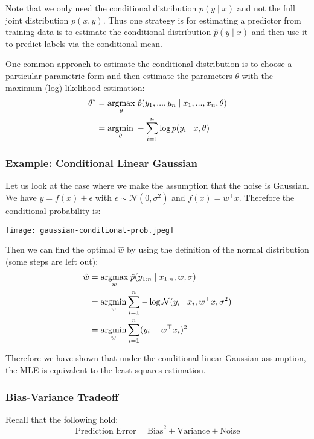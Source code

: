 Note that we only need the conditional distribution $p(y \; | \; x)$ and not the full joint distribution $p(x, y)$. Thus one strategy is for estimating a predictor from training data is to estimate the conditional distribution $\hat{p}(y \; | \; x)$ and then use it to predict labels via the conditional mean. \medskip

One common approach to estimate the conditional distribution is to choose a particular parametric form and then estimate the parameters $\theta$ with the maximum (log) likelihood estimation:
\begin{align*}
	\theta^* &= \underset{\theta}{\text{argmax}} \; \hat{p}(y_1, ..., y_n \; | \; x_1, ..., x_n, \theta) \\
	&= \underset{\theta}{\text{argmin}} \; - \sum_{i=1}^n \log p(y_i \; | \; x, \theta) 
\end{align*}

\subsubsection{Example: Conditional Linear Gaussian}

Let us look at the case where we make the assumption that the noise is Gaussian. We have $y = f(x) + \epsilon$ with $\epsilon \sim \mathcal{N}(0, \sigma^2)$ and $f(x) = w^\top x$. Therefore the conditional probability is:
\begin{center}
	\texttt{[image: gaussian-conditional-prob.jpeg]}
\end{center}

Then we can find the optimal $\hat w$ by using the definition of the normal distribution (some steps are left out):
\begin{align*}
	\hat w &= \underset{w}{\text{argmax}} \; \hat p(y_{1:n} \; | \; x_{1:n}, w, \sigma) \\
	&= \underset{w}{\text{argmin}} \sum_{i=1}^n - \log \mathcal{N}(y_i \; | \; x_i, w^\top x, \sigma^2) \\
	&= \underset{w}{\text{argmin}} \sum_{i=1}^n (y_i - w^\top x_i)^2
\end{align*}

Therefore we have shown that under the conditional linear Gaussian assumption, the MLE is equivalent to the least squares estimation.

\subsubsection{Bias-Variance Tradeoff}

Recall that the following hold:
$$\text{Prediction Error} = \text{Bias}^2 + \text{Variance} + \text{Noise}$$

